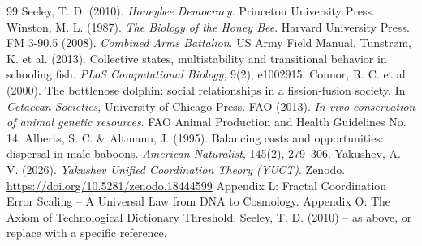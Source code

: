 \documentclass[12pt]{article}
\theoremstyle{remark}
\begin{document}
	\begin{thebibliography}{99}
		 Seeley, T. D. (2010). \emph{Honeybee Democracy}. Princeton University Press.
		 Winston, M. L. (1987). \emph{The Biology of the Honey Bee}. Harvard University Press.
		 FM 3-90.5 (2008). \emph{Combined Arms Battalion}. US Army Field Manual.
		 Tunstrøm, K. et al. (2013). Collective states, multistability and transitional behavior in schooling fish. \emph{PLoS Computational Biology}, 9(2), e1002915.
		 Connor, R. C. et al. (2000). The bottlenose dolphin: social relationships in a fission‑fusion society. In: \emph{Cetacean Societies}, University of Chicago Press.
		 FAO (2013). \emph{In vivo conservation of animal genetic resources}. FAO Animal Production and Health Guidelines No. 14.
		 Alberts, S. C. \& Altmann, J. (1995). Balancing costs and opportunities: dispersal in male baboons. \emph{American Naturalist}, 145(2), 279–306.
		 Yakushev, A. V. (2026). \emph{Yakushev Unified Coordination Theory (YUCT)}. Zenodo. \url{https://doi.org/10.5281/zenodo.18444599}
		 Appendix L: Fractal Coordination Error Scaling – A Universal Law from DNA to Cosmology.
		 Appendix O: The Axiom of Technological Dictionary Threshold.
		 Seeley, T. D. (2010) – as above, or replace with a specific reference.
	\end{thebibliography}
	
\end{document}
